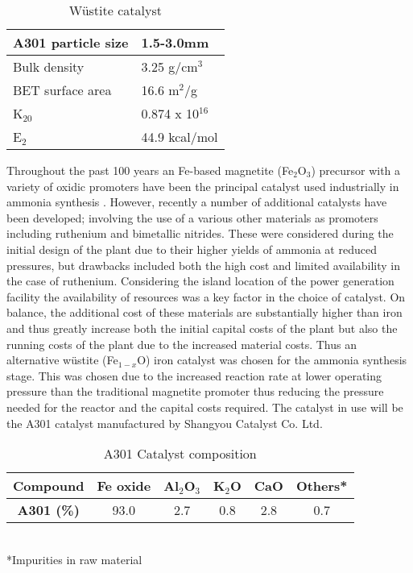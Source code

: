 \begin{wraptable}{r}{0.4\textwidth}
	{\singlespacing
\centering
		\caption{W\"{u}stite catalyst \cite{Pernicone2003}}
		\begin{tabular}{ |l|l|  }
			\hline
			A301 particle size & 1.5-3.0mm\\
			\hline
			Bulk density & 3.25 g/cm$^3$\\
			\hline
			BET surface area & 16.6 m$^2$/g\\
			\hline
			K$_{20}$&  0.874 x 10$^{16}$\\
			\hline
			E$_2$ &44.9 kcal/mol \\
			\hline
		\end{tabular}
}
\end{wraptable}
Throughout the past 100 years an Fe-based magnetite (Fe$_{2}$O$_3$) precursor with a variety of oxidic promoters have been the principal catalyst used industrially in ammonia synthesis \cite{Liu2014}. However, recently a number of additional catalysts have been developed; involving the use of a various other materials as promoters including ruthenium and bimetallic nitrides. These were considered during the initial design of the plant due to their higher yields of ammonia at reduced pressures, but drawbacks included both the high cost and limited availability in the case of ruthenium. Considering the island location of the power generation facility the availability of resources was a key factor in the choice of catalyst. On balance, the additional cost of these materials are substantially higher than iron and thus greatly increase both the initial capital costs of the plant but also the running costs of the plant due to the increased material costs. Thus an alternative w\"{u}stite (Fe$_{1-x}$O) iron catalyst was chosen for the ammonia synthesis stage. This was chosen due to the increased reaction rate at lower operating pressure than the traditional magnetite promoter thus reducing the pressure needed for the reactor and the capital costs required. The catalyst in use will be the A301 catalyst manufactured by Shangyou Catalyst Co. Ltd. 

\begin{table}[!htbp]
	\begin{center}
		\caption{A301 Catalyst composition}
		\begin{tabular}{ |c|c|c|c|c|c| }
			
			\hline
			\textbf{Compound} &Fe oxide & Al$_2$O$_3$ & K$_2$O & CaO & Others*\\
				\hline
			\textbf{A301 (\%)} &93.0 & 2.7 & 0.8 & 2.8 & 0.7\\
			\hline
		\end{tabular}
	\small
	\\
	*Impurities in raw material
	\end{center}
\end{table}

